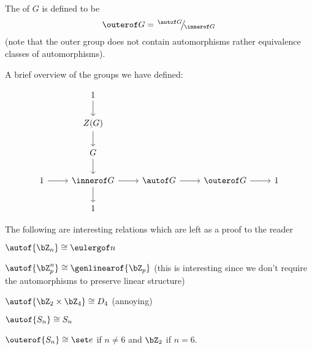 \documentclass[10pt]{article}
\def\slfrac#1#2{\left.{}^{#1}\mkern-4mu\middle/\mkern-3mu{}_{#2}\right.}
\begin{document}
\begin{defn*}

    The  of $G$ is defined to be
    \[ \outerof G=\slfrac{\autof G}{\innerof G} \]
    (note that the outer group does not contain automorphisms rather equivalence classes of automorphisms).

\end{defn*}

A brief overview of the groups we have defined:

\[ \begin{tikzcd}
    & 1 \\
    & Z(G) \\
    & G \\
    1 & \innerof G & \autof G & \outerof G & 1 \\
    & 1
    \arrow[from=1-2, to=2-2]
    \arrow[from=2-2, to=3-2]
    \arrow[from=3-2, to=4-2]
    \arrow[from=4-2, to=5-2]
    \arrow[from=4-1, to=4-2]
    \arrow[from=4-2, to=4-3]
    \arrow[from=4-3, to=4-4]
    \arrow[from=4-4, to=4-5]
\end{tikzcd} \]

The following are interesting relations which are left as a proof to the reader
\benum
    \item $\autof{\bZ_n}\cong\eulergof n$
    \item $\autof{\bZ_p^n}\cong\genlinearof{\bZ_p}$ (this is interesting since we don't require the automorphisms to preserve linear structure)
    \item $\autof{\bZ_2\times\bZ_4}\cong D_4$ (annoying)
    \item $\autof{S_n}\cong S_n$
    \item $\outerof{S_n}\cong\set e$ if $n\neq6$ and $\bZ_2$ if $n=6$.
\eenum
\end{document}
